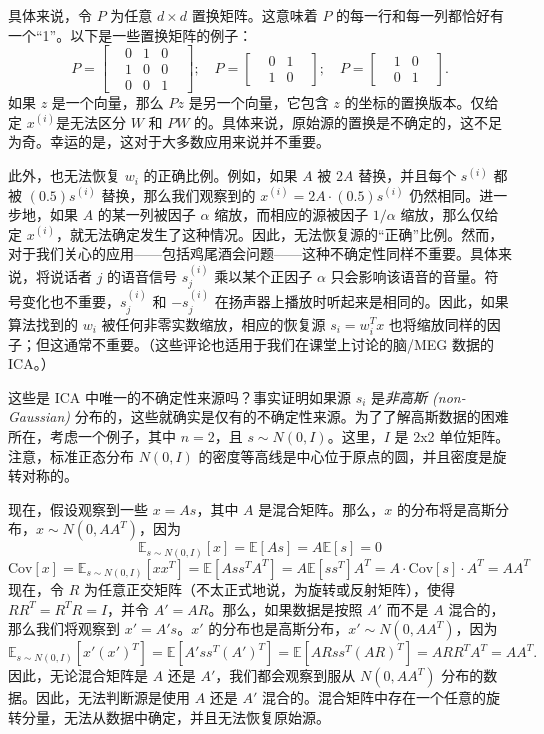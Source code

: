具体来说，令 $P$ 为任意 $d \times d$ 置换矩阵。这意味着 $P$ 的每一行和每一列都恰好有一个“1”。以下是一些置换矩阵的例子：
\[
    P = \begin{bmatrix} 
        & 0 & 1 & 0 & \\
        & 1 & 0 & 0 & \\
        & 0 & 0 & 1 & 
    \end{bmatrix}; 
    \quad P = \begin{bmatrix} 
        & 0 & 1 & \\
        & 1 & 0 & 
    \end{bmatrix}; 
    \quad P = \begin{bmatrix}
        & 1 & 0 & \\
        & 0 & 1 & 
    \end{bmatrix}.
\]
如果 $z$ 是一个向量，那么 $Pz$ 是另一个向量，它包含 $z$ 的坐标的置换版本。仅给定 $x^{(i)}$是无法区分 $W$ 和 $PW$ 的。具体来说，原始源的置换是不确定的，这不足为奇。幸运的是，这对于大多数应用来说并不重要。

此外，也无法恢复 $w_i$ 的正确比例。例如，如果 $A$ 被 $2A$ 替换，并且每个 $s^{(i)}$ 都被 $(0.5)s^{(i)}$ 替换，那么我们观察到的 $x^{(i)} = 2A \cdot (0.5)s^{(i)}$ 仍然相同。进一步地，如果 $A$ 的某一列被因子 $\alpha$ 缩放，而相应的源被因子 $1/\alpha$ 缩放，那么仅给定 $x^{(i)}$，就无法确定发生了这种情况。因此，无法恢复源的“正确”比例。然而，对于我们关心的应用——包括鸡尾酒会问题——这种不确定性同样不重要。具体来说，将说话者 $j$ 的语音信号 $s_j^{(i)}$ 乘以某个正因子 $\alpha$ 只会影响该语音的音量。符号变化也不重要，$s_j^{(i)}$ 和 $-s_j^{(i)}$ 在扬声器上播放时听起来是相同的。因此，如果算法找到的 $w_i$ 被任何非零实数缩放，相应的恢复源 $s_i = w_i^T x$ 也将缩放同样的因子；但这通常不重要。（这些评论也适用于我们在课堂上讨论的脑/MEG 数据的 ICA。）

这些是 ICA 中唯一的不确定性来源吗？事实证明如果源 $s_i$ 是\textit{非高斯 (non-Gaussian)} 分布的，这些就确实是仅有的不确定性来源。为了了解高斯数据的困难所在，考虑一个例子，其中 $n=2$，且 $s \sim N(0, I)$。这里，$I$ 是 2x2 单位矩阵。注意，标准正态分布 $N(0, I)$ 的密度等高线是中心位于原点的圆，并且密度是旋转对称的。

现在，假设观察到一些 $x = As$，其中 $A$ 是混合矩阵。那么，$x$ 的分布将是高斯分布，$x \sim N(0, AA^T)$，因为
\[
    \mathbb{E}_{s \sim N(0, I)}[x] = \mathbb{E}[As] = A\mathbb{E}[s] = 0
\]
\[
    \text{Cov}[x] = \mathbb{E}_{s \sim N(0, I)}[xx^T] = \mathbb{E}[Ass^T A^T] = A\mathbb{E}[ss^T]A^T = A \cdot \text{Cov}[s] \cdot A^T = AA^T
\]
现在，令 $R$ 为任意正交矩阵（不太正式地说，为旋转或反射矩阵），使得 $RR^T = R^T R = I$，并令 $A' = AR$。那么，如果数据是按照 $A'$ 而不是 $A$ 混合的，那么我们将观察到 $x' = A's$。$x'$ 的分布也是高斯分布，$x' \sim N(0, AA^T)$，因为
\[
    \mathbb{E}_{s \sim N(0, I)}[x'(x')^T] = \mathbb{E}[A'ss^T (A')^T] = \mathbb{E}[ARss^T (AR)^T] = ARR^T A^T = AA^T.
\]
因此，无论混合矩阵是 $A$ 还是 $A'$，我们都会观察到服从 $N(0, AA^T)$ 分布的数据。因此，无法判断源是使用 $A$ 还是 $A'$ 混合的。混合矩阵中存在一个任意的旋转分量，无法从数据中确定，并且无法恢复原始源。

